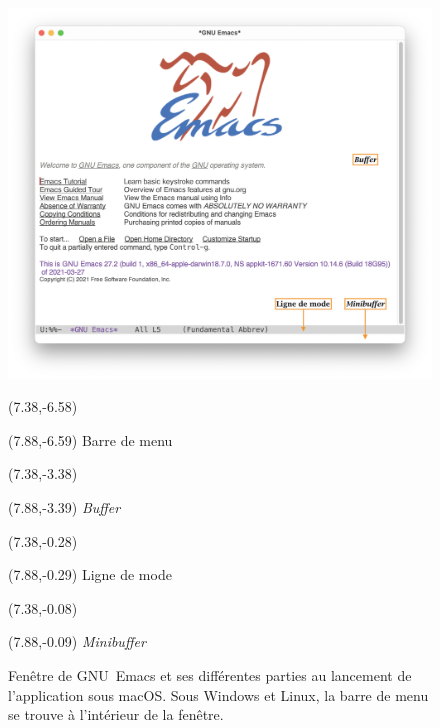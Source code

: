 \begin{figure}[t]
  \includegraphics{images/emacswindow-screenshot}

  \begingroup
  \begin{textblock}{0.35}(7.38,-6.58)
    \Large\faLongArrowAltRight
  \end{textblock}
  \begin{textblock}{1.75}(7.88,-6.59)
    \footnotesize\sffamily Barre de menu
  \end{textblock}

  \begin{textblock}{0.35}(7.38,-3.38)
    \Large\faLongArrowAltRight
  \end{textblock}
  \begin{textblock}{1.75}(7.88,-3.39)
    \footnotesize\sffamily \emph{Buffer}
  \end{textblock}

  \begin{textblock}{0.35}(7.38,-0.28)
    \Large\faLongArrowAltRight
  \end{textblock}
  \begin{textblock}{1.75}(7.88,-0.29)
    \footnotesize\sffamily Ligne de mode
  \end{textblock}

  \begin{textblock}{0.35}(7.38,-0.08)
    \Large\faLongArrowAltRight
  \end{textblock}
  \begin{textblock}{1.75}(7.88,-0.09)
    \footnotesize\sffamily \emph{Minibuffer}
  \end{textblock}
  \endgroup
  \caption[Fenêtre de GNU~Emacs sous macOS]{Fenêtre de GNU~Emacs et
    ses différentes parties au lancement de l'application sous macOS.
    Sous Windows et Linux, la barre de menu se trouve à l'intérieur de
    la fenêtre.}
  \label{fig:ess:emacswindow}
\end{figure}


